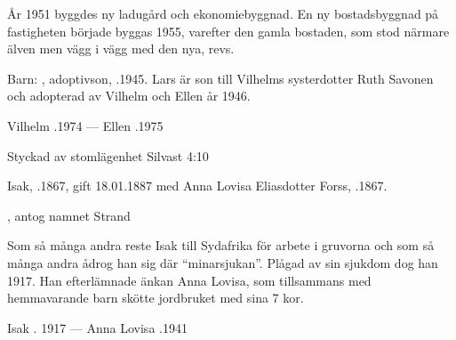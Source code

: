 År 1951 byggdes ny ladugård och ekonomiebyggnad. En ny bostadsbyggnad på fastigheten började byggas 1955, varefter den gamla bostaden, som stod närmare älven men vägg i vägg med den nya, revs.

Barn: , adoptivson, .1945. Lars är son till Vilhelms systerdotter Ruth Savonen och adopterad av Vilhelm och Ellen år 1946.

Vilhelm .1974  ---  Ellen .1975




Styckad av stomlägenhet Silvast 4:10


Isak, .1867, gift 18.01.1887 med Anna Lovisa Eliasdotter Forss, .1867.
\begin{jhchildren}
  \item {}
  \item {}, antog namnet Strand
  \item {}
  \item {}
  \item {}
  \item {}
  \item {}
  \item {}
  \item {}
\end{jhchildren}

Som så många andra reste Isak till Sydafrika för arbete i gruvorna och som så många andra ådrog han sig där ``minarsjukan''. Plågad av sin sjukdom dog han 1917. Han efterlämnade änkan Anna Lovisa, som tillsammans med hemmavarande barn skötte jordbruket med sina 7 kor.

Isak . 1917  ---  Anna Lovisa .1941


